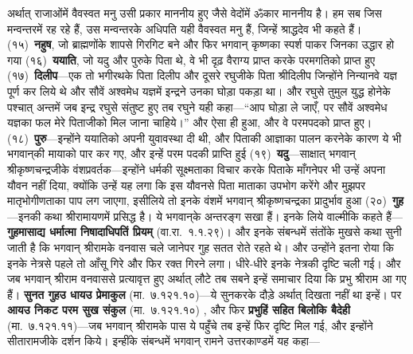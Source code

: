 \begin{sloppypar}\justifying{}
अर्थात् राजाओंमें वैवस्वत मनु उसी प्रकार माननीय हुए जैसे वेदोंमें ॐकार माननीय है। हम सब जिस मन्वन्तरमें रह रहे हैं, उस मन्वन्तरके अधिपति यही वैवस्वत मनु हैं, जिन्हें श्राद्धदेव भी कहते हैं। (१५)~\textbf{नहुष}, जो ब्राह्मणोंके शापसे गिरगिट बने और फिर भगवान् कृष्णका स्पर्श पाकर जिनका उद्धार हो गया (१६)~\textbf{ययाति}, जो यदु और पुरुके पिता थे, वे भी दृढ़ वैराग्य प्राप्त करके परमगतिको प्राप्त हुए (१७)~\textbf{दिलीप}—एक तो भगीरथके पिता दिलीप और दूसरे रघुजीके पिता श्रीदिलीप जिन्होंने निन्यानवे यज्ञ पूर्ण कर लिये थे और सौवें अश्वमेध यज्ञमें इन्द्रने उनका घोड़ा पकड़ा था। और रघुसे तुमुल युद्ध होनेके पश्चात् अन्तमें जब इन्द्र रघुसे संतुष्ट हुए तब रघुने यही कहा—“आप घोड़ा ले जाएँ, पर सौवें अश्वमेध यज्ञका फल मेरे पिताजीको मिल जाना चाहिये।” और ऐसा ही हुआ, और वे परमपदको प्राप्त हुए। (१८)~\textbf{पुरु}—इन्होंने ययातिको अपनी युवावस्था दी थी, और पिताकी आज्ञाका पालन करनेके कारण ये भी भगवान्‌की मायाको पार कर गए, और इन्हें परम पदकी प्राप्ति हुई (१९)~\textbf{यदु}—साक्षात् भगवान् श्रीकृष्णचन्द्रजीके वंशप्रवर्तक—इन्होंने धर्मकी सूक्ष्मताका विचार करके पिताके माँगनेपर भी उन्हें अपना यौवन नहीं दिया, क्योंकि उन्हें यह लगा कि इस यौवनसे पिता माताका उपभोग करेंगे और मुझपर मातृभोगीणताका पाप लग जाएगा, इसीलिये तो इनके वंशमें भगवान् श्रीकृष्णचन्द्रका प्रादुर्भाव हुआ (२०)~\textbf{गुह}—इनकी कथा श्रीरामायणमें प्रसिद्ध है। ये भगवान्‌के अन्तरङ्ग सखा हैं। इनके लिये वाल्मीकि कहते हैं—\textbf{गुहमासाद्य धर्मात्मा निषादाधिपतिं प्रियम्} (वा.रा.~१.१.२९)। और इनके संबन्धमें संतोंके मुखसे कथा सुनी जाती है कि भगवान् श्रीरामके वनवास चले जानेपर गुह सतत रोते रहते थे। और उन्होंने इतना रोया कि इनके नेत्रसे पहले तो आँसू गिरे और फिर रक्त गिरने लगा। धीरे-धीरे इनके नेत्रकी दृष्टि चली गई। और जब भगवान् श्रीराम वनवाससे प्रत्यावृत्त हुए अर्थात् लौटे तब सबने इन्हें समाचार दिया कि प्रभु श्रीराम आ गए हैं। \textbf{सुनत गुहउ धायउ प्रेमाकुल} (मा.~७.१२१.१०)—ये सुनकरके दौड़े अर्थात् दिखता नहीं था इन्हें। पर \textbf{आयउ निकट परम सुख संकुल} (मा.~७.१२१.१०) , और फिर \textbf{प्रभुहिं सहित बिलोकि बैदेही} (मा.~७.१२१.११)—जब भगवान् श्रीरामके पास ये पहुँचे तब इन्हें फिर दृष्टि मिल गई, और इन्होंने सीतारामजीके दर्शन किये। इन्हींके संबन्धमें भगवान् रामने उत्तरकाण्डमें यह कहा—
\end{sloppypar}


